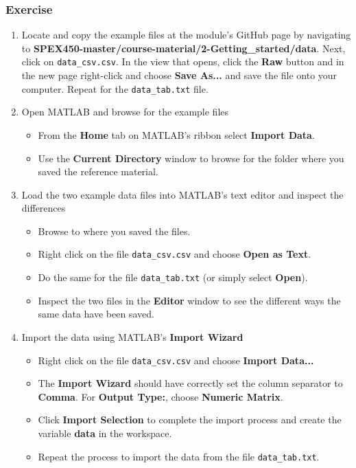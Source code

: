 \documentclass[12pt,a4paper]{article}
\begin{document}
\subsubsection*{Exercise}
\begin{enumerate}
	\item Locate and copy the example files at the module's GitHub page by navigating to \textbf{SPEX450-master/course-material/2-Getting\_started/data}. Next, click on \texttt{data\_csv.csv}. In the view that opens, click the \textbf{Raw} button and in the new page right-click and choose \textbf{Save As...} and save the file onto your computer. Repeat for the \texttt{data\_tab.txt} file. 
	\item Open MATLAB and browse for the example files
	\begin{itemize}
		\item From the \textbf{Home} tab on MATLAB's ribbon select \textbf{Import Data}.
		\item Use the \textbf{Current Directory} window to browse for the folder where you saved the reference material.
	\end{itemize}
	\item Load the two example data files into MATLAB's text editor and inspect the differences
	\begin{itemize}	
		\item Browse to where you saved the files.
		\item Right click on the file \texttt{data\_csv.csv} and choose \textbf{Open as Text}.
		\item Do the same for the file \texttt{data\_tab.txt} (or simply select \textbf{Open}).
		\item Inspect the two files in the \textbf{Editor} window to see the different ways the same data have been saved.		
	\end{itemize}
	\item Import the data using MATLAB's \textbf{Import Wizard}
	\begin{itemize}	
		\item Right click on the file \texttt{data\_csv.csv} and choose \textbf{Import Data...}
		\item The \textbf{Import Wizard} should have correctly set the column separator to \textbf{Comma}. For \textbf{Output Type:}, choose \textbf{Numeric Matrix}.
		\item Click \textbf{Import Selection} to complete the import process and create the variable \textbf{data} in the workspace.
		\item Repeat the process to import the data from the file \texttt{data\_tab.txt}.

\end{itemize}
\end{enumerate}
\end{document}
